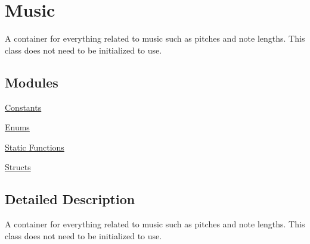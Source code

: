 \hypertarget{group___doc_music}{}\section{Music}
\label{group___doc_music}


A container for everything related to music such as pitches and note lengths. This class does not need to be initialized to use.  


\subsection*{Modules}
\begin{DoxyCompactItemize}
\item 
\hyperlink{group___music_constants}{Constants}
\item 
\hyperlink{group___music_enums}{Enums}
\item 
\hyperlink{group___music_stat_func}{Static Functions}
\item 
\hyperlink{group___music_structs}{Structs}
\end{DoxyCompactItemize}


\subsection{Detailed Description}
A container for everything related to music such as pitches and note lengths. This class does not need to be initialized to use. 

